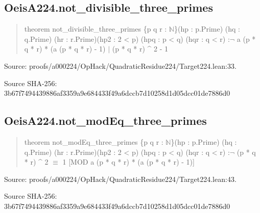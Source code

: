 \documentclass[11pt,a4paper]{article}
\begin{document}
\begin{samepage}
\subsection{OeisA224.not\_divisible\_three\_primes}
\begin{quote}\small\ttfamily theorem not\_divisible\_three\_primes \{p q r : \ensuremath{\mathbb{N}}\}\newline     (hp : p.Prime) (hq : q.Prime) (hr : r.Prime)\newline     (hp2 : 2 < p) (hpq : p < q) (hqr : q < r) :\newline     \ensuremath{\neg} a (p * q * r) * (a (p * q * r) - 1) \ensuremath{\mid} (p * q * r) \textasciicircum{} 2 - 1\end{quote}
{\small Source: proofs/a000224/OpHack/QuadraticResidue224/Target224.lean:33.\par}

{\small Source SHA-256: 3b67f7494439886af3359a9e684433f49a6dccb7d10258d1d05dcc01de7886d0\par}

\end{samepage}
\begin{samepage}
\subsection{OeisA224.not\_modEq\_three\_primes}
\begin{quote}\small\ttfamily theorem not\_modEq\_three\_primes \{p q r : \ensuremath{\mathbb{N}}\}\newline     (hp : p.Prime) (hq : q.Prime) (hr : r.Prime)\newline     (hp2 : 2 < p) (hpq : p < q) (hqr : q < r) :\newline     \ensuremath{\neg} (p * q * r) \textasciicircum{} 2 \ensuremath{\equiv} 1 [MOD a (p * q * r) * (a (p * q * r) - 1)]\end{quote}
{\small Source: proofs/a000224/OpHack/QuadraticResidue224/Target224.lean:43.\par}

{\small Source SHA-256: 3b67f7494439886af3359a9e684433f49a6dccb7d10258d1d05dcc01de7886d0\par}

\end{samepage}
\end{document}
